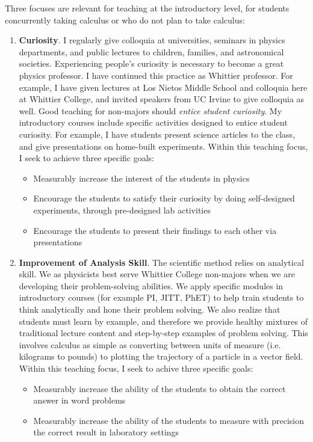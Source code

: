 \documentclass[../../main.tex]{subfiles}
\begin{document}
Three focuses are relevant for teaching at the introductory level, for students concurrently taking calculus or who do not plan to take calculus:
\begin{enumerate}
\item \textbf{Curiosity}.  I regularly give colloquia at universities, seminars in physics departments, and public lectures to children, families, and astronomical societies.  Experiencing people's curiosity is necessary to become a great physics professor.  I have continued this practice as Whittier professor.  For example, I have given lectures at Los Nietos Middle School and colloquia here at Whittier College, and invited speakers from UC Irvine to give colloquia as well.  Good teaching for non-majors should \textit{entice student curiosity}.  My introductory courses include specific activities designed to entice student curiosity.  For example, I have students present science articles to the class, and give presentations on home-built experiments.  Within this teaching focus, I seek to achieve three specific goals:

\begin{itemize}
\item Measurably increase the interest of the students in physics %
\item Encourage the students to satisfy their curiosity by doing self-designed experiments, through pre-designed lab activities %
\item Encourage the students to present their findings to each other via presentations %
\end{itemize}

\item \textbf{Improvement of Analysis Skill}.  The scientific method relies on analytical skill.  We as physicists best serve Whittier College non-majors when we are developing their problem-solving abilities.  We apply specific modules in introductory courses (for example PI, JITT, PhET) to help train students to think analytically and hone their problem solving.  We also realize that students must learn by example, and therefore we provide healthy mixtures of traditional lecture content and step-by-step examples of problem solving.  This involves calculus as simple as converting between units of measure (i.e. kilograms to pounds) to plotting the trajectory of a particle in a vector field.  Within this teaching focus, I seek to achive three specific goals:

\begin{itemize}
\item Measurably increase the ability of the students to obtain the correct answer in word problems %
\item Measurably increase the ability of the students to measure with precision the correct result in laboratory settings 
\end{itemize}


\end{enumerate}
\end{document}
